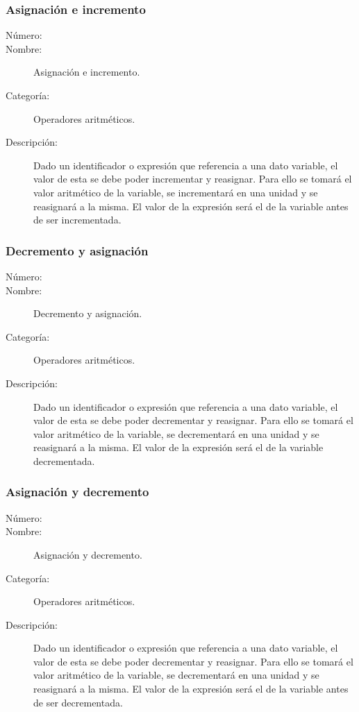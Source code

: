 \subsubsection{Asignación e incremento}
\begin{framed}
	\begin{description}
		\item [Número:] \cn
		\item [Nombre:] Asignación e incremento.
		\item [Categoría:] Operadores aritméticos.
		\item [Descripción:] Dado un identificador o expresión que referencia a una dato variable, el valor de esta se debe poder incrementar y
		reasignar. Para ello se tomará el valor aritmético de la variable, se incrementará en una unidad y se reasignará a la misma.
		El valor de la expresión será el de la variable antes de ser incrementada.
	\end {description}
\end{framed}

\subsubsection{Decremento y asignación}
\begin{framed}
	\begin{description}
		\item [Número:] \cn
		\item [Nombre:] Decremento y asignación.
		\item [Categoría:] Operadores aritméticos.
		\item [Descripción:] Dado un identificador o expresión que referencia a una dato variable, el valor de esta se debe poder decrementar y
		reasignar. Para ello se tomará el valor aritmético de la variable, se decrementará en una unidad y se reasignará a la misma.
		El valor de la expresión será el de la variable decrementada.
	\end {description}
\end{framed}

\subsubsection{Asignación y decremento}
\begin{framed}
	\begin{description}
		\item [Número:] \cn
		\item [Nombre:] Asignación y decremento.
		\item [Categoría:] Operadores aritméticos.
		\item [Descripción:] Dado un identificador o expresión que referencia a una dato variable, el valor de esta se debe poder decrementar y
		reasignar. Para ello se tomará el valor aritmético de la variable, se decrementará en una unidad y se reasignará a la misma.
		El valor de la expresión será el de la variable antes de ser decrementada.
	\end {description}
\end{framed}

